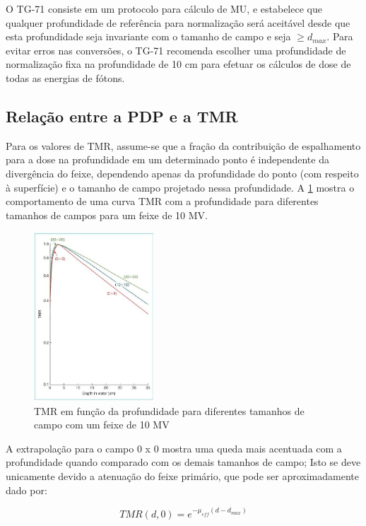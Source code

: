\documentclass[11pt,a4paper]{article}
\begin{document}
    O TG-71 consiste em um protocolo para cálculo de MU, e estabelece que qualquer profundidade de referência para normalização será aceitável desde que esta profundidade seja invariante com o tamanho de campo e seja $\geq d_{max}$. Para evitar erros nas conversões, o TG-71 recomenda escolher uma profundidade de normalização fixa na profundidade de 10 cm para efetuar os cálculos de dose de todas as energias de fótons.

    \subsection{Relação entre a PDP e a TMR}

    Para os valores de TMR, assume-se que a fração da contribuição de espalhamento para a dose na profundidade em um determinado ponto é independente da divergência do feixe, dependendo apenas da profundidade do ponto (com respeito à superfície) e o tamanho de campo projetado nessa profundidade. A \ref{fig:tmrECampo} mostra o comportamento de uma curva TMR com a profundidade para diferentes tamanhos de campos para um feixe de 10 MV. 

    \begin{figure}[h]
        \centering
        \includegraphics[width=0.4\textwidth]{Imagens/tmrECampo.JPG}
        \caption{TMR em função da profundidade para diferentes tamanhos de campo com um feixe de 10 MV}
        \label{fig:tmrECampo}                
    \end{figure}
    
    A extrapolação para o campo 0 x 0 mostra uma queda mais acentuada com a profundidade quando comparado com os demais tamanhos de campo; Isto se deve unicamente devido a atenuação do feixe primário, que pode ser aproximadamente dado por:

        \begin{equation}
            TMR(d, 0) = e^{-\mu_{eff}(d - d_{max})}
        \end{equation}
\end{document}
